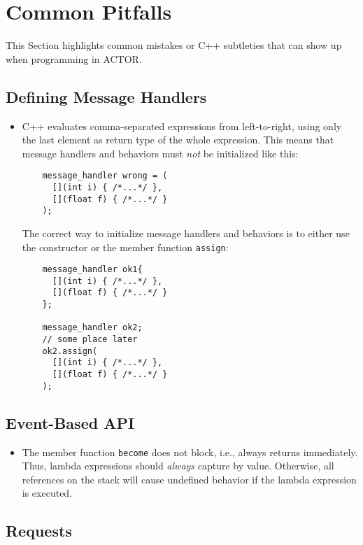 \section{Common Pitfalls}
\label{pitfalls}

This Section highlights common mistakes or C++ subtleties that can show up when
programming in ACTOR.

\subsection{Defining Message Handlers}

\begin{itemize}
\item C++ evaluates comma-separated expressions from left-to-right, using only
  the last element as return type of the whole expression. This means that
    message handlers and behaviors must \emph{not} be initialized like this:
    \begin{lstlisting}
    message_handler wrong = (
      [](int i) { /*...*/ },
      [](float f) { /*...*/ }
    );
    \end{lstlisting}
    The correct way to initialize message handlers and behaviors is to either
    use the constructor or the member function \lstinline^assign^:
    \begin{lstlisting}
    message_handler ok1{
      [](int i) { /*...*/ },
      [](float f) { /*...*/ }
    };

    message_handler ok2;
    // some place later
    ok2.assign(
      [](int i) { /*...*/ },
      [](float f) { /*...*/ }
    );
    \end{lstlisting}
\end{itemize}

\subsection{Event-Based API}

\begin{itemize}
\item The member function \lstinline^become^ does not block, i.e., always
  returns immediately. Thus, lambda expressions should \textit{always} capture
    by value. Otherwise, all references on the stack will cause undefined
    behavior if the lambda expression is executed.
\end{itemize}

\subsection{Requests}

